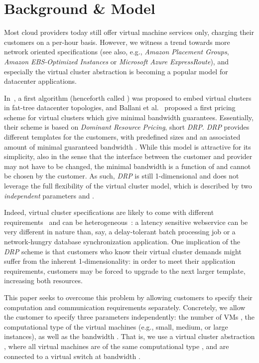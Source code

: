 \documentclass{sig-alternate-per}
\begin{document}
\section{Background \& Model}\label{sec:model}

Most cloud providers today still offer virtual machine services only,
charging their customers on a per-hour basis.
However, we witness a trend towards more network oriented specifications
(see also, e.g., \emph{Amazon Placement Groups}, \emph{Amazon EBS-Optimized Instances} or \emph{Microsoft Azure ExpressRoute}),
and especially the virtual cluster abstraction is becoming a
popular model for datacenter applications.~\cite{short-ballani2011towards}

In~\cite{short-ballani2011towards}, a first algorithm (henceforth called ) was proposed
to embed virtual clusters in fat-tree datacenter topologies,
and Ballani et al.~\cite{short-ballani2011price} proposed a first pricing scheme
for virtual clusters which give minimal bandwidth guarantees.
Essentially, their scheme is based on \emph{Dominant Resource Pricing}, short \emph{DRP}.
\emph{DRP} provides different templates for the customers, with predefined sizes  and
an associated amount of minimal guaranteed bandwidth .
While this model is attractive for its simplicity,
also in the sense that the interface between the customer and provider may not have to be changed,
the minimal bandwidth  is a function of  and cannot be chosen by the customer.
As such, \emph{DRP} is still 1-dimensional and does not leverage the full flexibility of the virtual cluster model,
which is described by two
\emph{independent} parameters  and .

Indeed, virtual cluster specifications are likely to come with different requirements~\cite{short-mesos}
and can be heterogeneous~\cite{short-talk-about}: a latency sensitive webservice
can be very different in nature than, say, a delay-tolerant batch processing job or a network-hungry database synchronization application.
One implication of the \emph{DRP} scheme is that customers who know their virtual cluster demands might suffer
from the inherent 1-dimensionality: in order to meet their application requirements,
customers may be forced to upgrade to the next larger template, increasing both resources.

This paper seeks to overcome this problem by allowing customers to specify their computation
and communication requirements separately.
Concretely, we allow the customer to specify three parameters independently:
the number of VMs , the computational type  of the virtual machines (e.g., small, medium, or large instances),
as well as the bandwidth . That is, we use a virtual cluster abstraction ,
where all virtual machines are of the same computational type , and are connected to a virtual switch at bandwidth .
\end{document}
